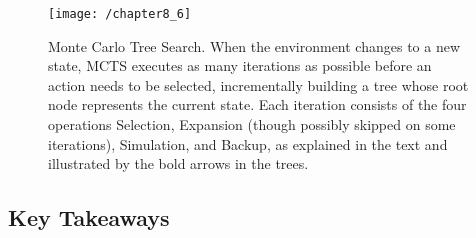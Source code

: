 \begin{figure}
	\centering
	\texttt{[image: /chapter8\_6]}
	\caption{Monte Carlo Tree Search. When the environment changes to a new state, MCTS executes as many iterations as possible before an action needs to be selected, incrementally building a tree whose root node represents the current state. Each iteration consists of the four operations Selection, Expansion (though possibly skipped on some iterations), Simulation, and Backup, as explained in the text and illustrated by the bold arrows in the trees.}
	\label{fig: MCTS}
\end{figure}

\subsection{Key Takeaways}
